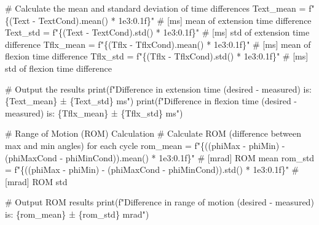 \documentclass[
  11pt,
  a4paper]{article}
\newenvironment{Shaded}{\begin{snugshade}}{\end{snugshade}}
\newcommand{\BuiltInTok}[1]{\textcolor[rgb]{0.00,0.23,0.31}{#1}}
\newcommand{\CommentTok}[1]{\textcolor[rgb]{0.37,0.37,0.37}{#1}}
\newcommand{\FloatTok}[1]{\textcolor[rgb]{0.68,0.00,0.00}{#1}}
\newcommand{\NormalTok}[1]{\textcolor[rgb]{0.00,0.23,0.31}{#1}}
\newcommand{\OperatorTok}[1]{\textcolor[rgb]{0.37,0.37,0.37}{#1}}
\newcommand{\SpecialCharTok}[1]{\textcolor[rgb]{0.37,0.37,0.37}{#1}}
\newcommand{\SpecialStringTok}[1]{\textcolor[rgb]{0.13,0.47,0.30}{#1}}
\begin{document}
\begin{Shaded}
\begin{Highlighting}[]
\CommentTok{\# Calculate the mean and standard deviation of time differences}
\NormalTok{Text\_mean }\OperatorTok{=} \SpecialStringTok{f"}\SpecialCharTok{\{}\NormalTok{(Text }\OperatorTok{{-}}\NormalTok{ TextCond)}\SpecialCharTok{.}\NormalTok{mean() }\OperatorTok{*} \FloatTok{1e3}\SpecialCharTok{:0.1f\}}\SpecialStringTok{"}  \CommentTok{\# [ms] mean of extension time difference}
\NormalTok{Text\_std }\OperatorTok{=} \SpecialStringTok{f"}\SpecialCharTok{\{}\NormalTok{(Text }\OperatorTok{{-}}\NormalTok{ TextCond)}\SpecialCharTok{.}\NormalTok{std() }\OperatorTok{*} \FloatTok{1e3}\SpecialCharTok{:0.1f\}}\SpecialStringTok{"}  \CommentTok{\# [ms]  std of extension time difference}
\NormalTok{Tflx\_mean }\OperatorTok{=} \SpecialStringTok{f"}\SpecialCharTok{\{}\NormalTok{(Tflx }\OperatorTok{{-}}\NormalTok{ TflxCond)}\SpecialCharTok{.}\NormalTok{mean() }\OperatorTok{*} \FloatTok{1e3}\SpecialCharTok{:0.1f\}}\SpecialStringTok{"}  \CommentTok{\# [ms]  mean of flexion time difference}
\NormalTok{Tflx\_std }\OperatorTok{=} \SpecialStringTok{f"}\SpecialCharTok{\{}\NormalTok{(Tflx }\OperatorTok{{-}}\NormalTok{ TflxCond)}\SpecialCharTok{.}\NormalTok{std() }\OperatorTok{*} \FloatTok{1e3}\SpecialCharTok{:0.1f\}}\SpecialStringTok{"}  \CommentTok{\# [ms] std of flexion time difference}

\CommentTok{\# Output the results}
\BuiltInTok{print}\NormalTok{(}\SpecialStringTok{f"Difference in extension time (desired {-} measured) is: }\SpecialCharTok{\{}\NormalTok{Text\_mean}\SpecialCharTok{\}}\SpecialStringTok{ ± }\SpecialCharTok{\{}\NormalTok{Text\_std}\SpecialCharTok{\}}\SpecialStringTok{ ms"}\NormalTok{)}
\BuiltInTok{print}\NormalTok{(}\SpecialStringTok{f"Difference in flexion time (desired {-} measured) is: }\SpecialCharTok{\{}\NormalTok{Tflx\_mean}\SpecialCharTok{\}}\SpecialStringTok{ ± }\SpecialCharTok{\{}\NormalTok{Tflx\_std}\SpecialCharTok{\}}\SpecialStringTok{ ms"}\NormalTok{)}

\CommentTok{\# Range of Motion (ROM) Calculation}
\CommentTok{\# Calculate ROM (difference between max and min angles) for each cycle}
\NormalTok{rom\_mean }\OperatorTok{=} \SpecialStringTok{f"}\SpecialCharTok{\{}\NormalTok{((phiMax }\OperatorTok{{-}}\NormalTok{ phiMin) }\OperatorTok{{-}}\NormalTok{ (phiMaxCond }\OperatorTok{{-}}\NormalTok{ phiMinCond))}\SpecialCharTok{.}\NormalTok{mean() }\OperatorTok{*} \FloatTok{1e3}\SpecialCharTok{:0.1f\}}\SpecialStringTok{"} \CommentTok{\# [mrad] ROM mean}
\NormalTok{rom\_std  }\OperatorTok{=} \SpecialStringTok{f"}\SpecialCharTok{\{}\NormalTok{((phiMax }\OperatorTok{{-}}\NormalTok{ phiMin) }\OperatorTok{{-}}\NormalTok{ (phiMaxCond }\OperatorTok{{-}}\NormalTok{ phiMinCond))}\SpecialCharTok{.}\NormalTok{std() }\OperatorTok{*} \FloatTok{1e3}\SpecialCharTok{:0.1f\}}\SpecialStringTok{"}  \CommentTok{\# [mrad] ROM std}

\CommentTok{\# Output ROM results}
\BuiltInTok{print}\NormalTok{(}\SpecialStringTok{f"Difference in range of motion (desired {-} measured) is: }\SpecialCharTok{\{}\NormalTok{rom\_mean}\SpecialCharTok{\}}\SpecialStringTok{ ± }\SpecialCharTok{\{}\NormalTok{rom\_std}\SpecialCharTok{\}}\SpecialStringTok{ mrad"}\NormalTok{)}
\end{Highlighting}
\end{Shaded}
\end{document}
